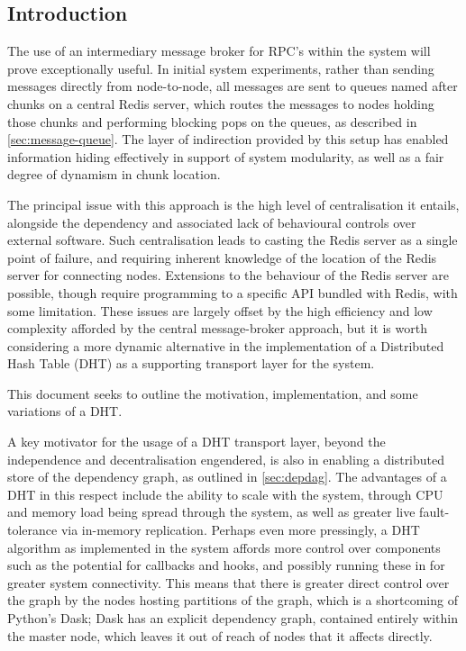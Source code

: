\subsection{Introduction}

The use of an intermediary message broker for RPC's within the \lsr system will prove exceptionally useful.
In initial system experiments, rather than sending messages directly from node-to-node, all messages are sent to queues named after chunks on a central Redis server, which routes the messages to nodes holding those chunks and performing blocking pops on the queues\cite{sanfilippo2009redis}, as described in \cref{sec:message-queue}.
The layer of indirection provided by this setup has enabled information hiding effectively in support of system modularity, as well as a fair degree of dynamism in chunk location.

The principal issue with this approach is the high level of centralisation it entails, alongside the dependency and associated lack of behavioural controls over external software\cite{john2017survey}.
Such centralisation leads to casting the Redis server as a single point of failure, and requiring inherent knowledge of the location of the Redis server for connecting nodes.
Extensions to the behaviour of the Redis server are possible, though require programming to a specific API bundled with Redis, with some limitation.
These issues are largely offset by the high efficiency and low complexity afforded by the central message-broker approach, but it is worth considering a more dynamic alternative in the implementation of a Distributed Hash Table (DHT) as a supporting transport layer for the system.

This document seeks to outline the motivation, implementation, and some variations of a DHT.

A key motivator for the usage of a DHT transport layer, beyond the independence and decentralisation engendered, is also in enabling a distributed store of the dependency graph, as outlined in \cref{sec:depdag}.
The advantages of a DHT in this respect include the ability to scale with the system, through CPU and memory load being spread through the system, as well as greater live fault-tolerance via in-memory replication\cite{lua2005p2p}.
Perhaps even more pressingly, a DHT algorithm as implemented in the system affords more control over components such as the potential for callbacks and hooks, and possibly running these in \R{} for greater system connectivity.
This means that there is greater direct control over the graph by the nodes hosting partitions of the graph, which is a shortcoming of Python's Dask; Dask has an explicit dependency graph, contained entirely within the master node, which leaves it out of reach of nodes that it affects directly\cite{rocklin2015dask}.

